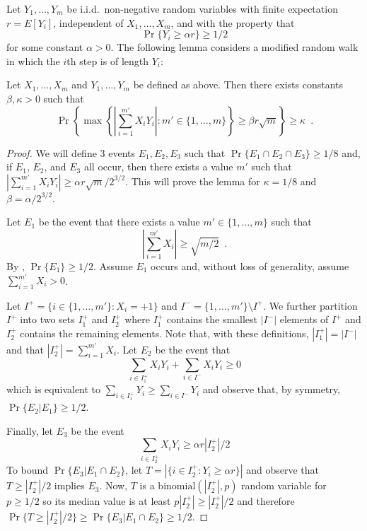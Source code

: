 \documentclass[lotsofwhite]{patmorin}
\begin{document}
Let $Y_1,\ldots,Y_m$ be i.i.d.\
non-negative random variables with finite expectation $r=E[Y_i]$,
independent of $X_1,\ldots,X_m$, and with the
property that 
\[ \Pr\{Y_i \ge \alpha r\} \ge 1/2 \]
for some constant
$\alpha > 0$.  The following lemma considers a modified random walk in
which the $i$th step is of length $Y_i$:
\begin{lem}
Let $X_1,\ldots,X_m$ and $Y_1,\ldots,Y_m$ be defined as above.  Then
there exists constants $\beta,\kappa>0$ such that
\[
  \Pr\left\{\max\left\{
           \left|\sum_{i=1}^{m'} X_iY_i\right| : m'\in\{1,\ldots,m\}\right\}
            \ge \beta r\sqrt{m}\right\} 
     \ge \kappa \enspace .
\]
\end{lem}

\begin{proof}
We will define 3 events $E_1,E_2,E_3$ such that
$\Pr\{E_1\cap E_2\cap E_3\} \ge 1/8$ and, if $E_1$, $E_2$, and $E_3$
all occur, then there exists a value $m'$ such that
$\left|\sum_{i=1}^{m'}
X_iY_i\right| \ge \alpha r \sqrt{m}/2^{3/2}$.  This will prove the
lemma for $\kappa = 1/8$ and $\beta = \alpha/2^{3/2}$.

Let $E_1$ be the event that there exists a value $m'\in\{1,\ldots,m\}$
such that 
\[
   \left|\sum_{i=1}^{m'} X_i\right| \ge \sqrt{m/2} \enspace .
\]
By , $\Pr\{E_1\}\ge 1/2$.  Assume $E_1$ occurs
and, without loss of generality, assume $\sum_{i=1}^{m'} X_i > 0$.

Let $I^{+} = \{i\in\{1,\ldots,m'\}: X_i=+1\}$ and
$I^-=\{1,\ldots,m'\}\setminus I^+$.  We further partition $I^+$ into
two sets $I^+_1$ and $I^+_2$ where $I^+_1$ contains the smallest
$|I^-|$ elements of $I^+$ and $I^+_2$ contains the remaining elements.
Note that, with these definitions, $|I^+_1|=|I^-|$ and that
$|I^+_2|=\sum_{i=1}^{m'} X_i$.  Let $E_2$ be the event that
\[
     \sum_{i\in I^+_1}X_iY_i + \sum_{i\in I^-} X_iY_i \ge 0
\]
which is equivalent to $\sum_{i\in I^+_1}Y_i \ge \sum_{i\in I^-} Y_i$
and observe that, by symmetry, $\Pr\{E_2|E_1\}\ge 1/2$.

Finally, let $E_3$ be the event
\[
   \sum_{i\in I^+_2} X_iY_i \ge \alpha r|I^+_2|/2
\]
To bound $\Pr\{E_3|E_1\cap E_2\}$, let $T=\left|\{i\in I^+_2:Y_i\ge
\alpha r\}\right|$ and observe that
$T\ge |I^+_2|/2$ implies $E_3$. Now, $T$ is a
$\mathrm{binomial}(|I^+_2|,p)$ random variable for $p\ge 1/2$ so its
median value is at least $p|I^+_2| \ge |I^+_2|/2$ and therefore
$\Pr\{T\ge |I^+_2|/2\} \ge \Pr\{E_3|E_1\cap E_2\} \ge 1/2$.


\end{proof}
\end{document}
